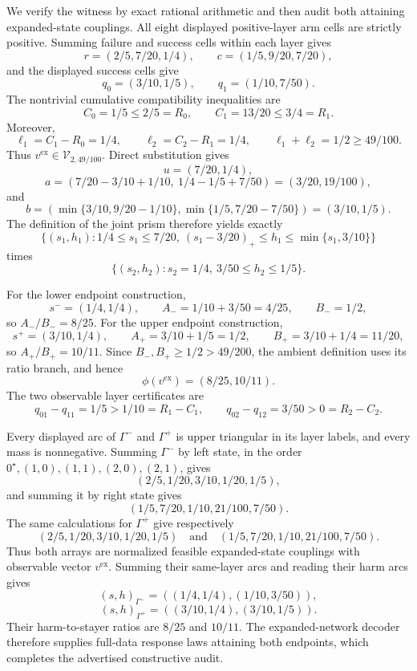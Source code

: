We verify the witness by exact rational arithmetic and then audit both attaining expanded-state couplings.  All eight displayed positive-layer arm cells are strictly positive.  Summing failure and success cells within each layer gives
\[
 r=(2/5,7/20,1/4),
 \qquad
 c=(1/5,9/20,7/20),
\]
and the displayed success cells give
\[
 q_0=(3/10,1/5),
 \qquad
 q_1=(1/10,7/50).
\]
The nontrivial cumulative compatibility inequalities are
\[
 C_0=1/5\le2/5=R_0,
 \qquad
 C_1=13/20\le3/4=R_1.
\]
Moreover,
\[
 \ell_1=C_1-R_0=1/4,
 \qquad
 \ell_2=C_2-R_1=1/4,
 \qquad
 \ell_1+\ell_2=1/2\ge49/100.
\]
Thus \(v^{\mathrm{ex}}\in\mathcal V_{2,49/100}\).  Direct substitution gives
\[
 u=(7/20,1/4),
\]
\[
 a=\left(7/20-3/10+1/10,\ 1/4-1/5+7/50\right)
 =(3/20,19/100),
\]
and
\[
 b=\left(\min\{3/10,9/20-1/10\},
 \min\{1/5,7/20-7/50\}\right)
 =(3/10,1/5).
\]
The definition of the joint prism therefore yields exactly
\[
 \{(s_1,h_1):1/4\le s_1\le7/20,\ (s_1-3/20)_+\le h_1\le\min\{s_1,3/10\}\}
\]
times
\[
 \{(s_2,h_2):s_2=1/4,\ 3/50\le h_2\le1/5\}.
\]

For the lower endpoint construction,
\[
 s^-=(1/4,1/4),
 \qquad
 A_-=1/10+3/50=4/25,
 \qquad
 B_-=1/2,
\]
so \(A_-/B_-=8/25\).  For the upper endpoint construction,
\[
 s^+=(3/10,1/4),
 \qquad
 A_+=3/10+1/5=1/2,
 \qquad
 B_+=3/10+1/4=11/20,
\]
so \(A_+/B_+=10/11\).  Since \(B_-,B_+\ge1/2>49/200\), the ambient definition uses its ratio branch, and hence
\[
 \phi(v^{\mathrm{ex}})=(8/25,10/11).
\]
The two observable layer certificates are
\[
 q_{01}-q_{11}=1/5>1/10=R_1-C_1,
 \qquad
 q_{02}-q_{12}=3/50>0=R_2-C_2.
\]

Every displayed arc of \(\Gamma^-\) and \(\Gamma^+\) is upper triangular in its layer labels, and every mass is nonnegative.  Summing \(\Gamma^-\) by left state, in the order \(0^{\star},(1,0),(1,1),(2,0),(2,1)\), gives
\[
 (2/5,1/20,3/10,1/20,1/5),
\]
and summing it by right state gives
\[
 (1/5,7/20,1/10,21/100,7/50).
\]
The same calculations for \(\Gamma^+\) give respectively
\[
 (2/5,1/20,3/10,1/20,1/5)
 \quad\text{and}\quad
 (1/5,7/20,1/10,21/100,7/50).
\]
Thus both arrays are normalized feasible expanded-state couplings with observable vector \(v^{\mathrm{ex}}\).  Summing their same-layer arcs and reading their harm arcs gives
\[
 (s,h)_{\Gamma^-}=((1/4,1/4),(1/10,3/50)),
\]
\[
 (s,h)_{\Gamma^+}=((3/10,1/4),(3/10,1/5)).
\]
Their harm-to-stayer ratios are \(8/25\) and \(10/11\).  The expanded-network decoder therefore supplies full-data response laws attaining both endpoints, which completes the advertised constructive audit.

